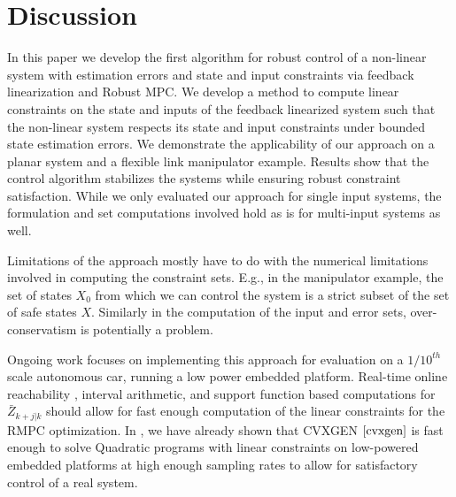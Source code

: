 \section{Discussion}
\label{sec:discussion}
In this paper we develop the first algorithm for robust control of a non-linear system with estimation errors and state and input constraints via feedback linearization and Robust MPC. 
We develop a method to compute linear constraints on the state and inputs of the feedback linearized system such that the non-linear system respects its state and input constraints under bounded state estimation errors. 
We demonstrate the applicability of our approach on a planar system and a flexible link manipulator example. Results show that the control algorithm stabilizes the systems while ensuring robust constraint satisfaction.%
While we only evaluated our approach for single input systems, the formulation and set computations involved hold as is for multi-input systems as well.

Limitations of the approach mostly have to do with the numerical limitations involved in computing the constraint sets.
E.g., in the manipulator example, the set of states $X_0$ from which we can control the system is a strict subset of the set of safe states $X$.
Similarly in the computation of the input and error sets, over-conservatism is potentially a problem.

Ongoing work focuses on implementing this approach for evaluation on a $1/10^{th}$ scale autonomous car, running a low power embedded platform. Real-time online reachability \cite{rtreach}, interval arithmetic,
and support function based computations for $\bar{Z}_{k+j|k}$ should allow for fast enough computation of the linear constraints for the RMPC optimization. In \cite{PantAMNDM15_Anytime}, we have already shown that CVXGEN $\cite{cvxgen}$ is fast enough to solve Quadratic programs with linear constraints on low-powered embedded platforms at high enough sampling rates to allow for satisfactory control of a real system.


